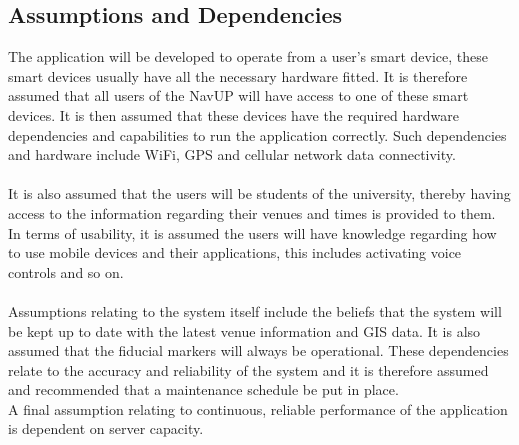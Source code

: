 	
	\subsection{Assumptions and Dependencies}
		The application will be developed to operate from a user's smart device, these smart devices usually have all the necessary hardware fitted. It is therefore assumed that all users of the NavUP will have access to one of these smart devices. It is then assumed that these devices have the required hardware dependencies and capabilities to run the application correctly. Such dependencies and hardware include WiFi, GPS and cellular network data connectivity.\\ \\
		It is also assumed that the users will be students of the university, thereby having access to the information regarding their venues and times is provided to them.\\
		In terms of usability, it is assumed the users will have knowledge regarding how to use mobile devices and their applications, this includes activating voice controls and so on. \\ \\
		Assumptions relating to the system itself include the beliefs that the system will be kept up to date with the latest venue information and GIS data. It is also assumed that the fiducial markers will always be operational. These dependencies relate to the accuracy and reliability of the system and it is therefore assumed and recommended that a maintenance schedule be put in place.\\
		A final assumption relating to continuous, reliable performance of the application is dependent on server capacity.

